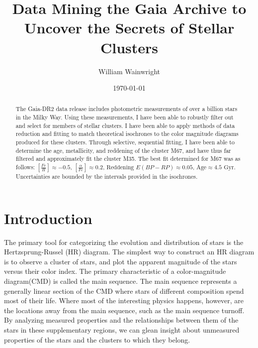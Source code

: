 \documentclass[aps,prb,twocolumn,groupedaddress,nofootinbib,floatfix]{revtex4-1}
\begin{document}
%
\title{Data Mining the Gaia Archive to Uncover the Secrets of Stellar Clusters}

%
\author{William Wainwright}
%
%
%
%

\date{\today}

\begin{abstract} The Gaia-DR2 data release includes photometric measurements of over a billion stars in the Milky Way. Using these measurements, I have been able to robustly filter out and select for members of stellar clusters. I have been able to apply methods of data reduction and fitting to match theoretical isochrones to the color magnitude diagrams produced for these clusters. Through selective, sequential fitting, I have been able to determine the age, metallicity, and reddening of the cluster M67, and have thus far filtered and approximately fit the cluster M35. The best fit determined for M67 was as follows: $\left[\frac{Fe}{H}\right]\approx -0.5$, $\left[\frac{\alpha}{Fe}\right]\approx 0.2$, $\text{Reddening } E\left(BP-RP\right)\approx 0.05$, $\text{Age}\approx 4.5 \text{ Gyr}$. Uncertainties are bounded by the intervals provided in the isochrones.
\end{abstract}

\maketitle

\section*{Introduction}
The primary tool for categorizing the evolution and distribution of stars is the Hertzsprung-Russel (HR) diagram. The simplest way to construct an HR diagram is to observe a cluster of stars, and plot the apparent magnitude of the stars versus their color index. The primary characteristic of a color-magnitude diagram(CMD) is called the main sequence. The main sequence represents a generally linear section of the CMD where stars of different composition spend most of their life. Where most of the interesting physics happens, however, are the locations away from the main sequence, such as the main sequence turnoff. By analyzing measured properties and the relationships between them of the stars in these supplementary regions, we can glean insight about unmeasured properties of the stars and the clusters to which they belong.
\end{document}
